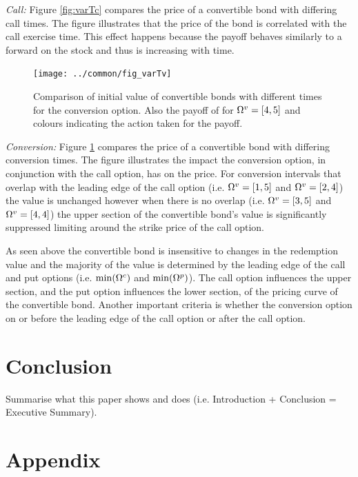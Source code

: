 \documentclass[a4paper,11pt,oneside]{report}
\theoremstyle{plain}
\theoremstyle{definition}
\begin{document}
\emph{Call:} Figure \ref{fig:varTc} compares the price of a convertible bond with differing call times.  The figure illustrates that the price of the bond is correlated with the call exercise time.  This effect happens because the payoff behaves similarly to a forward on the stock and thus is increasing with time.

\begin{figure}[htb!]
 \centering
 \texttt{[image: ../common/fig\_varTv]}
 \caption[Varying Call Time]{Comparison of initial value of convertible bonds with different times for the conversion option.  Also the payoff of for $\Omega^{v} = [4, 5]$ and colours indicating the action taken for the payoff.}
 \label{fig:varTv}
\end{figure}

\emph{Conversion:} Figure \ref{fig:varTv} compares the price of a convertible bond with differing conversion times.  The figure illustrates the impact the conversion option, in conjunction with the call option, has on the price.  For conversion intervals that overlap with the leading edge of the call option (i.e. $\Omega^{v} = [1, 5]$ and $\Omega^{v} = [2, 4]$) the value is unchanged however when there is no overlap (i.e. $\Omega^{v} = [3, 5]$ and $\Omega^{v} = [4, 4]$) the upper section of the convertible bond's value is significantly suppressed limiting around the strike price of the call option.

As seen above the convertible bond is insensitive to changes in the redemption value and the majority of the value is determined by the leading edge of the call and put options (i.e. $\min(\Omega^{c})$ and $\min(\Omega^{p})$).  The call option influences the upper section, and the put option influences the lower section, of the pricing curve of the convertible bond.  Another important criteria is whether the conversion option on or before the leading edge of the call option or after the call option.


\chapter{Conclusion}
Summarise what this paper shows and does (i.e. Introduction + Conclusion = Executive Summary).


\appendix
\chapter{Appendix}
\end{document}
